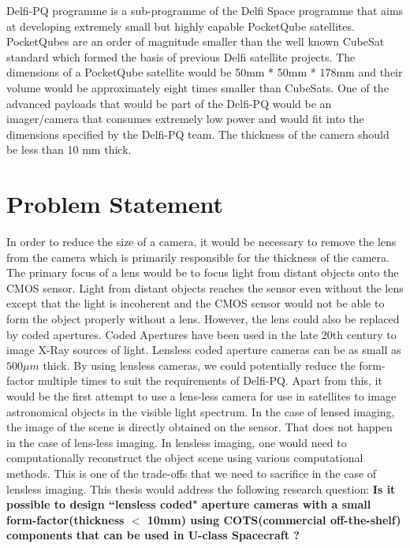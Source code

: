 Delfi-PQ programme is a sub-programme of the Delfi Space programme that aims at developing extremely small but highly capable PocketQube satellites. PocketQubes are an order of magnitude smaller than the well known CubeSat standard which formed the basis of previous Delfi satellite projects. The dimensions of a PocketQube satellite would be 50mm * 50mm * 178mm and their volume would be approximately eight times smaller than CubeSats. One of the advanced payloads that would be part of the Delfi-PQ would be an imager/camera that consumes extremely low power and would fit into the dimensions specified by the Delfi-PQ team. The thickness of the camera should be less than 10 mm thick.
 
 
\section{Problem Statement}
In order to reduce the size of a camera, it would be necessary to remove the lens from the camera which is primarily responsible for the thickness of the camera. The primary focus of a lens would be to focus light from distant objects onto the CMOS sensor. Light from distant objects reaches the sensor even without the lens except that the light is incoherent and the CMOS sensor would not be able to form the object properly without a lens. However, the lens could also be replaced by coded apertures. Coded Apertures have been used in the late 20th century to image X-Ray sources of light. Lensless coded aperture cameras can be as small as $500 \mu m$ thick. By using lensless cameras, we could potentially reduce the form-factor multiple times to suit the requirements of Delfi-PQ. Apart from this, it would be the first attempt to use a lens-less camera for use in satellites to image astronomical objects in the visible light spectrum. In the case of lensed imaging, the image of the scene is directly obtained on the sensor. That does not happen in the case of lens-less imaging. In lensless imaging, one would need to computationally reconstruct the object scene using various computational methods. This is one of the trade-offs that we need to sacrifice in the case of lensless imaging.
This thesis would address the following research question:
\textbf{Is it possible to design ``lensless coded" aperture cameras with a small form-factor(thickness $<$ 10mm) using COTS(commercial off-the-shelf) components that can be used in U-class Spacecraft ?}


